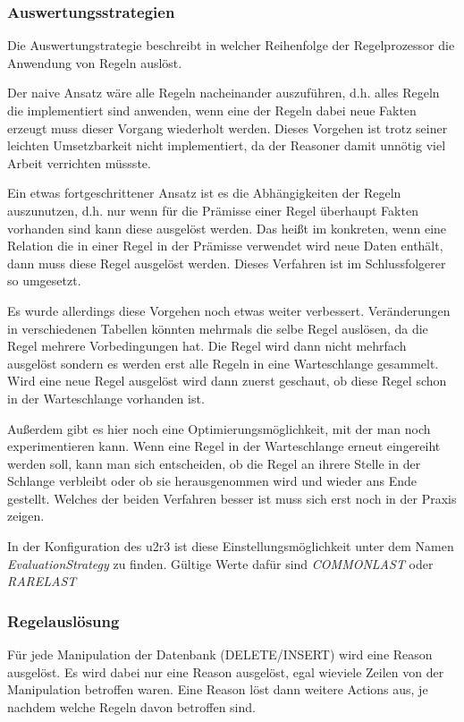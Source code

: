 \subsubsection{Auswertungsstrategien}
Die Auswertungstrategie beschreibt in welcher Reihenfolge der Regelprozessor die Anwendung von Regeln auslöst. 

Der naive Ansatz wäre alle Regeln nacheinander auszuführen, d.h. alles Regeln die implementiert sind anwenden, wenn eine der Regeln dabei neue Fakten erzeugt muss dieser Vorgang wiederholt werden. Dieses Vorgehen ist trotz seiner leichten Umsetzbarkeit nicht implementiert, da der Reasoner damit unnötig viel Arbeit verrichten müssste.

Ein etwas fortgeschrittener Ansatz ist es die Abhängigkeiten der Regeln auszunutzen, d.h. nur wenn für die Prämisse einer Regel überhaupt Fakten vorhanden sind kann diese ausgelöst werden. Das heißt im konkreten, wenn eine Relation die in einer Regel in der Prämisse verwendet wird neue Daten enthält, dann muss diese Regel ausgelöst werden. Dieses Verfahren ist im Schlussfolgerer so umgesetzt.

Es wurde allerdings diese Vorgehen noch etwas weiter verbessert. Veränderungen in verschiedenen Tabellen könnten mehrmals die selbe Regel auslösen, da die Regel mehrere Vorbedingungen  hat. Die Regel wird dann nicht mehrfach ausgelöst sondern es werden erst alle Regeln in eine Warteschlange gesammelt. Wird eine neue Regel ausgelöst wird dann zuerst geschaut, ob diese Regel schon in der Warteschlange vorhanden ist.

Außerdem gibt es hier noch eine Optimierungsmöglichkeit, mit der man noch experimentieren kann. Wenn eine Regel in der Warteschlange erneut eingereiht werden soll, kann man sich entscheiden, ob die Regel an ihrere Stelle in der Schlange verbleibt oder ob sie herausgenommen wird und wieder ans Ende gestellt. Welches der beiden Verfahren besser ist muss sich erst noch in der Praxis zeigen.

In der Konfiguration des u2r3 ist diese Einstellungsmöglichkeit unter dem Namen \emph{EvaluationStrategy} zu finden. Gültige Werte dafür sind \emph{COMMONLAST} oder \emph{RARELAST}

\subsubsection{Regelauslösung}
Für jede Manipulation der Datenbank (DELETE/INSERT) wird eine Reason ausgelöst. Es wird dabei nur eine Reason ausgelöst, egal wieviele Zeilen von der Manipulation betroffen waren. Eine Reason löst dann weitere Actions aus, je nachdem welche Regeln davon betroffen sind.

